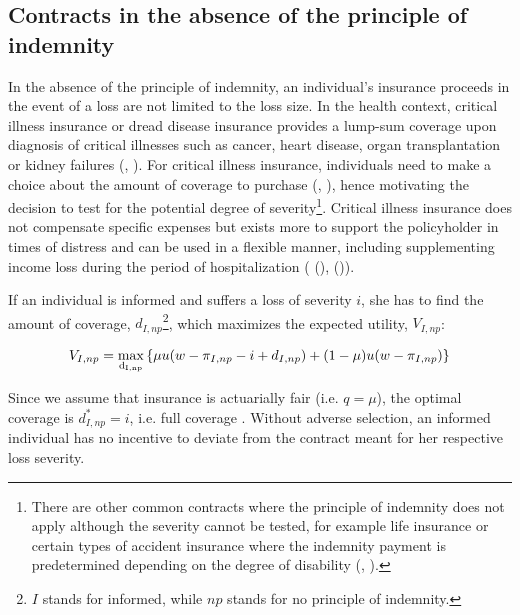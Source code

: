\documentclass[nonatbib,preprint,12pt]{elsarticle}
\theoremstyle{plain}
\theoremstyle{definition}
\theoremstyle{plain}
\theoremstyle{TheoremNum}
\theoremstyle{CorollaryNum}
\theoremstyle{PropositionNum}
\theoremstyle{TheoremNum}
\begin{document}
\subsection{Contracts in the absence of the principle of indemnity} \label{sev_absence}

In the absence of the principle of indemnity, an individual's insurance proceeds in the event of a loss are not limited to the loss size. In the health context, critical illness insurance or dread disease insurance provides a lump-sum coverage upon diagnosis of critical illnesses such as cancer, heart disease, organ transplantation or kidney failures (\citeauthor{clhia2024flip}, \citeyear{clhia2024flip}). For critical illness insurance, individuals need to make a choice about the amount of coverage to purchase (\citeauthor{bsd2022critical}, \citeyear{bsd2022critical}), hence motivating the decision to test for the potential degree of severity\footnote{There are other common contracts where the principle of indemnity does not apply although the severity cannot be tested, for example life insurance \autocite{swan1981subrogation} or certain types of accident insurance where the indemnity payment is predetermined depending on the degree of disability (\citeauthor{hansemerkur2024gliedertaxe}, \citeyear{hansemerkur2024gliedertaxe}).}. Critical illness insurance does not compensate specific expenses but exists more to support the policyholder in times of distress and can be used in a flexible manner, including supplementing income loss during the period of hospitalization (\citeauthor{li2019effect} (\citeyear{li2019effect}), \citeauthor{zhang2019critical} (\citeyear{zhang2019critical})).  

If an individual is informed and suffers a loss of severity $i$, she has to find the amount of coverage, $d_{I,np}$\footnote{$I$ stands for informed, while $np$ stands for no principle of indemnity.}, which maximizes the expected utility, $V_{I,np}$:

\begin{align}
    V_{I,np} = \underset{\rm d_{I,np}}{\rm max} \left\{\mu u(w-\pi_{I,np}-i+d_{I,np} )+(1-\mu)u(w-\pi_{I,np} )\right\}
\label{informed_np_maxproblem}
\end{align}

Since we assume that insurance is actuarially fair (i.e. $q=\mu$), the optimal coverage is $d_{I,np}^* = i$, i.e. full coverage \autocite{mossin1968aspects}. Without adverse selection, an informed individual has no incentive to deviate from the contract meant for her respective loss severity. 
\end{document}
